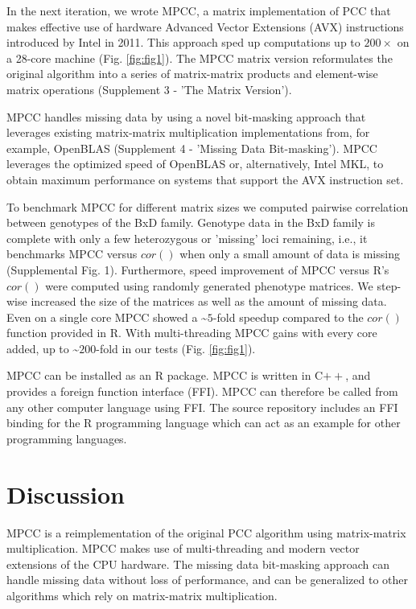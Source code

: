 \documentclass{bioinfo}
\begin{document}
In the next iteration, we wrote MPCC, a matrix implementation of PCC that makes effective
use of hardware Advanced Vector Extensions (AVX) instructions
introduced by Intel in 2011. This approach sped up computations up to
$200\times$ on a 28-core machine (Fig. \ref{fig:fig1}). The MPCC
matrix version reformulates the original algorithm into a series of
matrix-matrix products and element-wise matrix operations (Supplement 3 - 
'The Matrix Version'). 

MPCC handles missing data by using a novel bit-masking approach that
leverages existing matrix-matrix multiplication implementations from,
for example, OpenBLAS (Supplement 4 - 'Missing Data Bit-masking').
MPCC leverages the optimized speed of OpenBLAS or, alternatively,
Intel\textregistered{} MKL, to obtain maximum performance on systems
that support the AVX instruction set.

To benchmark MPCC for different matrix sizes we computed pairwise
correlation between genotypes of the BxD family. Genotype data in the
BxD family is complete with only a few heterozygous or 'missing' loci
remaining, i.e., it benchmarks MPCC versus $cor()$ when only a small amount
of data is missing (Supplemental Fig. 1). Furthermore, speed improvement of MPCC
versus R's $cor()$ were computed using randomly generated phenotype matrices. 
We step-wise increased the size of the matrices as well as the amount of 
missing data. Even on a single core MPCC showed a \textasciitilde{}$5$-fold 
speedup compared to the $cor()$ function provided in R. With multi-threading 
MPCC gains with every core added, up to \textasciitilde{}$200$-fold in our 
tests (Fig. \ref{fig:fig1}).

MPCC can be installed as an R package. MPCC is written in C$++$, and
provides a foreign function interface (FFI). MPCC can therefore be
called from any other computer language using FFI. The source
repository includes an FFI binding for the R programming language
which can act as an example for other programming languages.

\vspace*{2mm}
\section{Discussion}

MPCC is a reimplementation of the original PCC algorithm using matrix-matrix 
multiplication. MPCC makes use of multi-threading and modern vector 
extensions of the CPU hardware. The missing data bit-masking approach 
can handle missing data without loss of performance, and can be generalized 
to other algorithms which rely on matrix-matrix multiplication. 
\end{document}
